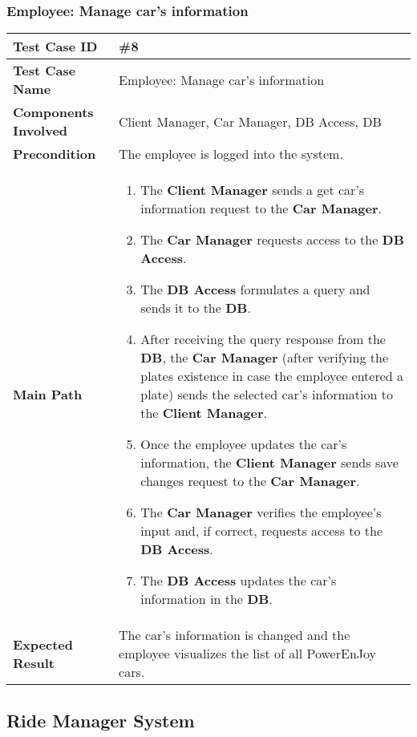 \subsubsection{Employee: Manage car's information}
\begin{center}
	\begin{tabular} { | m{4.5cm} | m{8.5cm} | }
		\hline
		\textbf{Test Case ID} & \#8\\
		\hline
		\textbf{Test Case Name} & Employee: Manage car's information\\
		\hline
		\textbf{Components Involved} & Client Manager, Car Manager, DB Access, DB\\
		\hline
		\textbf{Precondition} & The employee is logged into the system.\\
		\hline 
		\textbf{Main Path} & 
		\begin{enumerate}
			\item The \textbf{Client Manager} sends a get car's information request to the \textbf{Car Manager}.
			\item The \textbf{Car Manager} requests access to the \textbf{DB Access}.
			\item The \textbf{DB Access} formulates a query and sends it to the \textbf{DB}.
			\item After receiving the query response from the \textbf{DB}, the \textbf{Car Manager} (after verifying the plates existence in case the employee entered a plate) sends the selected car's information to the \textbf{Client Manager}. 
			\item Once the employee updates the car's information, the \textbf{Client Manager} sends save changes request to the \textbf{Car Manager}.
			\item The \textbf{Car Manager} verifies the employee's input and, if correct, requests access to the \textbf{DB Access}.
			\item The \textbf{DB Access} updates the car's information in the \textbf{DB}.
		\end{enumerate}\\
	\hline
	\textbf{Expected Result} & The car’s information is changed and the employee visualizes the list of all PowerEnJoy cars.\\
	\hline
	\end{tabular}
\end{center}
\newpage
\subsection{Ride Manager System}
